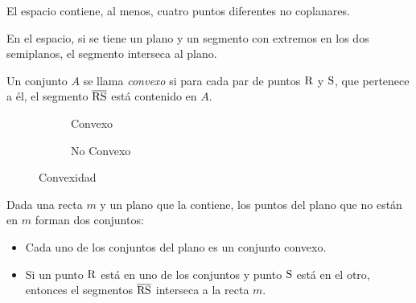 \begin{postulate}
El espacio contiene, al menos, cuatro puntos diferentes no coplanares.
\end{postulate}

\begin{postulate}
    En el espacio, si se tiene un plano y un segmento con extremos en los dos semiplanos, el segmento interseca al plano.
\end{postulate}

\begin{definition}
    Un conjunto $A$ se llama \textit{convexo} si para cada par de puntos $\rm R$ y $\rm S$, que pertenece a él, el segmento $\overline{\rm RS}$ está contenido en $A$.

    \begin{figure}[h!]

        \centering

        \begin{subfigure}[b]{.5\textwidth}
            \centering
            
            \label{fig:conjunto-convexo}
            \caption{Convexo}            
        \end{subfigure}%
        \begin{subfigure}[b]{.5\textwidth}
            \centering
            
            \label{fig:conjunto-no-convexo}
            \caption{No Convexo}            
        \end{subfigure}
        
        \centering
        \caption{Convexidad}
        \label{fig:convexidad}
    
    \end{figure}
    
\end{definition}

\begin{postulate}
    Dada una recta $m$ y un plano que la contiene, los puntos del plano que no están en $m$ forman dos conjuntos:

    \begin{itemize}
        \item Cada uno de los conjuntos del plano es un conjunto convexo.
        \item Si un punto $\rm R$ está en uno de los conjuntos y punto $\rm S$ está en el otro, entonces el segmentos $\overline{\rm RS}$ interseca a la recta $m$.
    \end{itemize}
\end{postulate}

